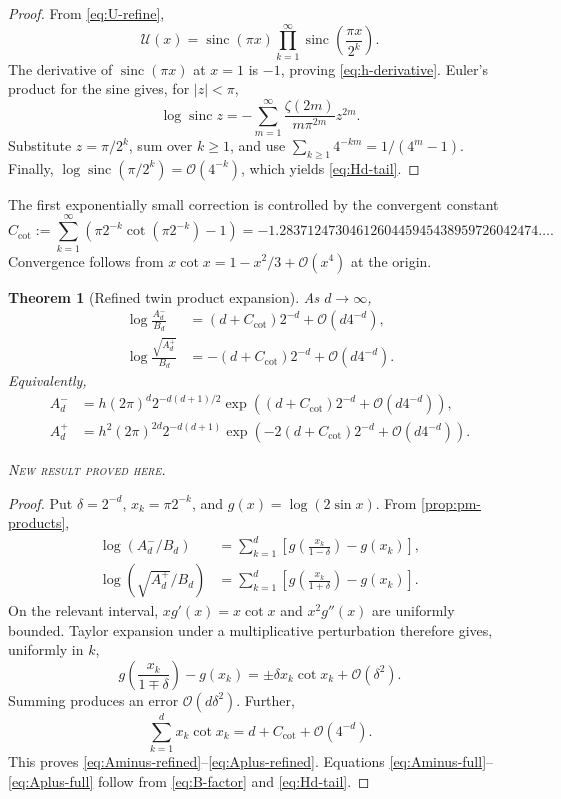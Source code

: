 \documentclass[11pt,oneside]{article}
\newtheorem{theorem}{Theorem}[section]
\theoremstyle{definition}
\theoremstyle{remark}
\newcommand{\sinc}{\operatorname{sinc}}
\newcommand{\bigO}{\mathcal O}
\newcommand{\newresult}{\textcolor{newgreen}{\textsc{New result proved here.}}}
\begin{document}
\begin{proof}
From \eqref{eq:U-refine},
\[
 \mathscr U(x)=\sinc(\pi x)
 \prod_{k=1}^{\infty}\sinc\!\left(\frac{\pi x}{2^k}\right).
\]
The derivative of $\sinc(\pi x)$ at $x=1$ is $-1$, proving
\eqref{eq:h-derivative}. Euler's product for the sine gives, for $|z|<\pi$,
\[
 \log\sinc z=-\sum_{m=1}^{\infty}\frac{\zeta(2m)}{m\pi^{2m}}z^{2m}.
\]
Substitute $z=\pi/2^k$, sum over $k\ge1$, and use
$\sum_{k\ge1}4^{-km}=1/(4^m-1)$. Finally,
$\log\sinc(\pi/2^k)=\bigO(4^{-k})$, which yields \eqref{eq:Hd-tail}.
\end{proof}

The first exponentially small correction is controlled by the convergent constant
\begin{equation}
 C_{\cot}:=\sum_{k=1}^{\infty}
 \left(\pi2^{-k}\cot(\pi2^{-k})-1\right)
 =-1.2837124730461260445945438959726042474\ldots.
 \label{eq:Ccot}
\end{equation}
Convergence follows from $x\cot x=1-x^2/3+\bigO(x^4)$ at the origin.

\begin{theorem}[Refined twin product expansion]\label{thm:pm-product-asymptotic}
As $d\to\infty$,
\begin{align}
 \log\frac{A_d^-}{B_d}
 &=(d+C_{\cot})2^{-d}+\bigO(d4^{-d}),
 \label{eq:Aminus-refined}\\
 \log\frac{\sqrt{A_d^+}}{B_d}
 &=-(d+C_{\cot})2^{-d}+\bigO(d4^{-d}).
 \label{eq:Aplus-refined}
\end{align}
Equivalently,
\begin{align}
 A_d^-&=h(2\pi)^d2^{-d(d+1)/2}
 \exp\!\left((d+C_{\cot})2^{-d}+\bigO(d4^{-d})\right),
 \label{eq:Aminus-full}\\
 A_d^+&=h^2(2\pi)^{2d}2^{-d(d+1)}
 \exp\!\left(-2(d+C_{\cot})2^{-d}+\bigO(d4^{-d})\right).
 \label{eq:Aplus-full}
\end{align}

\smallskip\noindent\newresult
\end{theorem}

\begin{proof}
Put $\delta=2^{-d}$, $x_k=\pi2^{-k}$, and $g(x)=\log(2\sin x)$. From
\cref{prop:pm-products},
\begin{align*}
 \log(A_d^-/B_d)
 &=\sum_{k=1}^{d}\left[g\!\left(\frac{x_k}{1-\delta}\right)-g(x_k)\right],\\
 \log(\sqrt{A_d^+}/B_d)
 &=\sum_{k=1}^{d}\left[g\!\left(\frac{x_k}{1+\delta}\right)-g(x_k)\right].
\end{align*}
On the relevant interval, $xg'(x)=x\cot x$ and $x^2g''(x)$ are uniformly bounded.
Taylor expansion under a multiplicative perturbation therefore gives, uniformly in
$k$,
\[
 g\!\left(\frac{x_k}{1\mp\delta}\right)-g(x_k)
 =\pm\delta x_k\cot x_k+\bigO(\delta^2).
\]
Summing produces an error $\bigO(d\delta^2)$. Further,
\[
 \sum_{k=1}^{d}x_k\cot x_k
 =d+C_{\cot}+\bigO(4^{-d}).
\]
This proves \eqref{eq:Aminus-refined}--\eqref{eq:Aplus-refined}. Equations
\eqref{eq:Aminus-full}--\eqref{eq:Aplus-full} follow from
\eqref{eq:B-factor} and \eqref{eq:Hd-tail}.
\end{proof}
\end{document}
